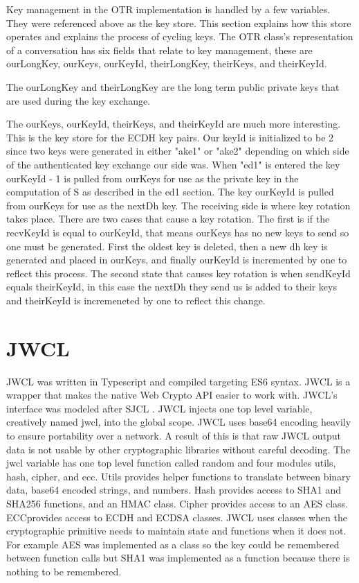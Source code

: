 Key management in the OTR implementation is handled by a few variables. They were referenced above as the key store. This section explains how this store operates and explains the process of cycling keys. The OTR class's representation of a conversation has six fields that relate to key management, these are ourLongKey, ourKeys, ourKeyId, theirLongKey, theirKeys, and theirKeyId. 


The ourLongKey and theirLongKey are the long term public private keys that are used during the key exchange. 


The ourKeys, ourKeyId, theirKeys, and theirKeyId are much more interesting. This is the key store for the ECDH key pairs. Our keyId is initialized to be 2 since two keys were generated in either "ake1" or "ake2" depending on which side of the authenticated key exchange our side was. When "ed1" is entered the key ourKeyId - 1 is pulled from ourKeys for use as the private key in the computation of S as described in the ed1 section. The key ourKeyId is pulled from ourKeys for use as the nextDh key. The receiving side is where key rotation takes place. There are two cases that cause a key rotation. The first is if the recvKeyId is equal to ourKeyId, that means ourKeys has no new keys to send so one must be generated. First the oldest key is deleted, then a new dh key is generated and placed in ourKeys, and finally ourKeyId is incremented by one to reflect this process. The second state that causes key rotation is when sendKeyId equals theirKeyId, in this case the nextDh they send us is added to their keys and theirKeyId is incremeneted by one to reflect this change.


\section{JWCL}


JWCL was written in Typescript and compiled targeting ES6 syntax. JWCL is a wrapper that makes the native Web Crypto API easier to work with. JWCL's interface was modeled after SJCL \cite{sjcl-library}. JWCL injects one top level variable, creatively named jwcl, into the global scope. JWCL uses base64 encoding heavily to ensure portability over a network. A result of this is  that raw JWCL output data is not usable by other cryptographic libraries without careful decoding. The jwcl variable has one top level function called random and four modules utils, hash, cipher, and ecc. Utils provides helper functions to translate between binary data, base64 encoded strings, and numbers. Hash provides access to SHA1 and SHA256 functions, and an HMAC class. Cipher provides access to an AES class. ECCprovides access to ECDH and ECDSA classes. JWCL uses classes when the cryptographic primitive needs to maintain state and functions when it does not. For example AES was implemented as a class so the key could be remembered between function calls but SHA1 was implemented as a function because there is nothing to be remembered. 


